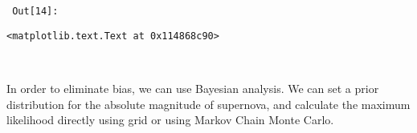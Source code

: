 \documentclass{article}
\newlength{\inputpadding}
\newlength{\cellleftmargin}
\newlength{\smallerfontscale}
\def\smaller{\fontsize{\smallerfontscale}{\smallerfontscale}\selectfont}
\begin{document}
\par\vspace{1\smallerfontscale}%
    
        {\par%
        \vspace{-1\smallerfontscale}%
        \noindent%
        \begin{minipage}{\cellleftmargin}%
    \hfill%
    {\smaller%
    \tt%
    \color{nbframe-out-prompt}%
    Out[14]:}%
    \hspace{\inputpadding}%
    \hspace{0em}%
    \hspace{3pt}%
    \end{minipage}%
        }%
    \begin{addmargin}[\cellleftmargin]{0em}%
    {\smaller%
    \vspace{-1\smallerfontscale}%
    
    
    
    \begin{verbatim}
<matplotlib.text.Text at 0x114868c90>
    \end{verbatim}

    
}%
    \end{addmargin}%
    \begin{addmargin}[\cellleftmargin]{0em}%
    {\smaller%
    \vspace{-1\smallerfontscale}%
    
    \begin{center}
    \end{center}
    { \hspace*{\fill} \\}
    }%
    \end{addmargin}%
    In order to eliminate bias, we can use Bayesian analysis. We can set a
prior distribution for the absolute magnitude of supernova, and
calculate the maximum likelihood directly using grid or using Markov
Chain Monte Carlo.
\end{document}
